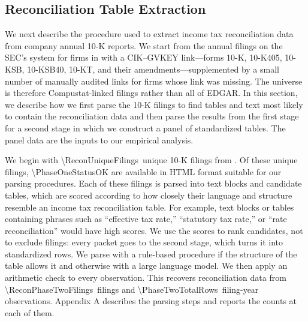 \documentclass[11pt,letterpaper]{article}
\newcommand{\CountNum}[1]{\num[round-mode=places,round-precision=0]{#1}}
\begin{document}
\subsection{Reconciliation Table Extraction}

We next describe the procedure used to extract income tax reconciliation data from company annual 
10-K reports. We start from the annual filings on the SEC's
\citet{EDGAR} system for firms in \citet{CompustatAnnual} with a
CIK--GVKEY link---forms 10-K, 10-K405, 10-KSB, 10-KSB40, 10-KT, and
their amendments---supplemented by a small number of manually audited
links for firms whose link was missing. The universe is therefore
Compustat-linked filings rather than all of EDGAR. In this section, we describe how
we first parse the 10-K filings to find tables and text most likely to contain the reconciliation
data and then parse the results from the first stage for a second stage in which
we construct a panel of standardized tables. The panel data are 
the inputs to our empirical analysis.

We begin with \CountNum{\ReconUniqueFilings}\ unique 10-K filings from \citet{EDGAR}.
Of these unique filings, \CountNum{\PhaseOneStatusOK} are available in 
HTML format suitable for our parsing procedures.
Each of these filings is parsed into text blocks and candidate 
tables, which are scored according to how
closely their language and structure resemble an income tax reconciliation table. 
For example, text blocks or tables  containing phrases such as ``effective tax rate,''
``statutory tax rate,'' or ``rate reconciliation'' would have high scores.
We use the scores to rank candidates, not to exclude filings: every
packet goes to the second stage, which turns it into standardized rows.
We parse with a rule-based procedure if the structure of the table
allows it and otherwise with a large language model. We then
apply an arithmetic check to every observation. This recovers
reconciliation data from \CountNum{\ReconPhaseTwoFilings}\ filings and
\CountNum{\PhaseTwoTotalRows}\ filing-year observations. Appendix A
describes the parsing steps and reports the counts at each of them.
\end{document}
